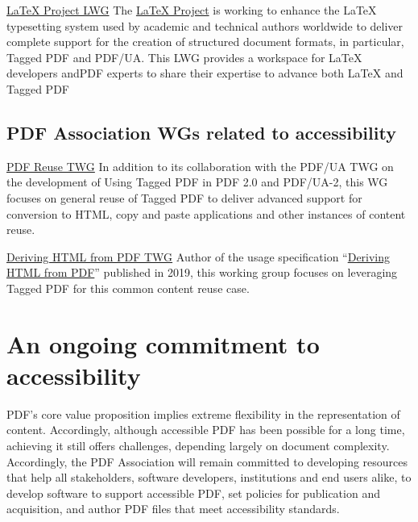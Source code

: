 \documentclass[12pt,a4paper]{article}
\begin{document}
\href{https://pdfa.org/community/latex-project-lwg/}{LaTeX Project LWG}
The \href{https://www.latex-project.org/}{LaTeX Project} is working to
enhance the LaTeX typesetting system used by academic and technical
authors worldwide to deliver complete support for the creation of
structured document formats, in particular, Tagged PDF and PDF/UA. This
LWG provides a workspace for LaTeX developers andPDF experts to share
their expertise to advance both LaTeX and Tagged PDF

\subsection{PDF Association WGs related to
accessibility}\label{pdf-association-wgs-related-to-accessibility}

\href{https://pdfa.org/community/pdf-reuse-twg/}{PDF Reuse TWG} In
addition to its collaboration with the PDF/UA TWG on the development of
Using Tagged PDF in PDF 2.0 and PDF/UA-2, this WG focuses on general
reuse of Tagged PDF to deliver advanced support for conversion to HTML,
copy and paste applications and other instances of content reuse.

\href{https://pdfa.org/community/deriving-html-from-pdf-twg/}{Deriving
HTML from PDF TWG} Author of the usage specification
``\href{https://pdfa.org/resource/deriving-html-from-pdf/}{Deriving HTML
from PDF}'' published in 2019, this working group focuses on leveraging
Tagged PDF for this common content reuse case.

\section{An ongoing commitment to
accessibility}\label{an-ongoing-commitment-to-accessibility}

PDF's core value proposition implies extreme flexibility in the
representation of content. Accordingly, although accessible PDF has been
possible for a long time, achieving it still offers challenges,
depending largely on document complexity. Accordingly, the PDF
Association will remain committed to developing resources that help all
stakeholders, software developers, institutions and end users alike, to
develop software to support accessible PDF, set policies for publication
and acquisition, and author PDF files that meet accessibility standards.
\end{document}
